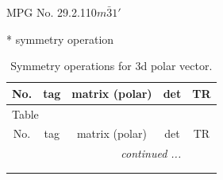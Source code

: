 \documentclass[fleqn,8pt]{jsarticle}
\begin{document}
\setcounter{MaxMatrixCols}{32}

\renewcommand{\tablename}{Table~}
\renewcommand{\figurename}{Figure~}
\begin{center}
\LARGE
MPG No. 29.2.110\quad$m\bar{3}1'$
\end{center}
* symmetry operation
\renewcommand{\arraystretch}{1.3}
\begin{longtable}{ccccc}
\caption{Symmetry operations for 3d polar vector.}
 \\
 \hline \hline
No. & tag & matrix (polar) & det & TR \\ \hline \endfirsthead

\multicolumn{4}{l}{\tablename\ \thetable{}} \\
 \hline \hline
No. & tag & matrix (polar) & det & TR \\ \hline \endhead

 \hline \hline
\multicolumn{4}{r}{\footnotesize\it continued ...} \\ \endfoot

 \hline \hline
\multicolumn{4}{r}{} \\ \endlastfoot


\end{longtable}
\end{document}
